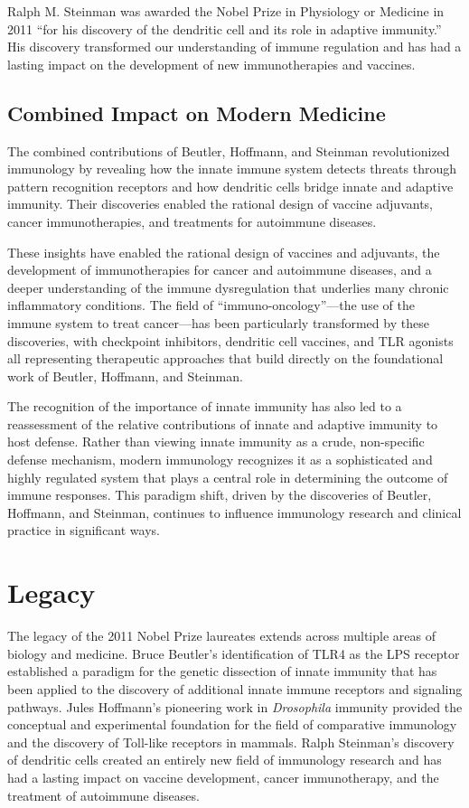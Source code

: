 Ralph M. Steinman was awarded the Nobel Prize in Physiology or Medicine in 2011 ``for his discovery of the dendritic cell and its role in adaptive immunity.'' His discovery transformed our understanding of immune regulation and has had a lasting impact on the development of new immunotherapies and vaccines.

\subsection{Combined Impact on Modern Medicine}

The combined contributions of Beutler, Hoffmann, and Steinman revolutionized immunology by revealing how the innate immune system detects threats through pattern recognition receptors and how dendritic cells bridge innate and adaptive immunity. Their discoveries enabled the rational design of vaccine adjuvants, cancer immunotherapies, and treatments for autoimmune diseases.

These insights have enabled the rational design of vaccines and adjuvants, the development of immunotherapies for cancer and autoimmune diseases, and a deeper understanding of the immune dysregulation that underlies many chronic inflammatory conditions. The field of ``immuno-oncology''---the use of the immune system to treat cancer---has been particularly transformed by these discoveries, with checkpoint inhibitors, dendritic cell vaccines, and TLR agonists all representing therapeutic approaches that build directly on the foundational work of Beutler, Hoffmann, and Steinman.

The recognition of the importance of innate immunity has also led to a reassessment of the relative contributions of innate and adaptive immunity to host defense. Rather than viewing innate immunity as a crude, non-specific defense mechanism, modern immunology recognizes it as a sophisticated and highly regulated system that plays a central role in determining the outcome of immune responses. This paradigm shift, driven by the discoveries of Beutler, Hoffmann, and Steinman, continues to influence immunology research and clinical practice in significant ways.

\section{Legacy}

The legacy of the 2011 Nobel Prize laureates extends across multiple areas of biology and medicine. Bruce Beutler's identification of TLR4 as the LPS receptor established a paradigm for the genetic dissection of innate immunity that has been applied to the discovery of additional innate immune receptors and signaling pathways. Jules Hoffmann's pioneering work in \textit{Drosophila} immunity provided the conceptual and experimental foundation for the field of comparative immunology and the discovery of Toll-like receptors in mammals. Ralph Steinman's discovery of dendritic cells created an entirely new field of immunology research and has had a lasting impact on vaccine development, cancer immunotherapy, and the treatment of autoimmune diseases.

